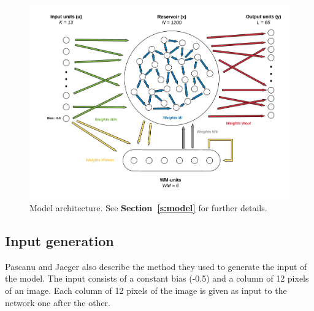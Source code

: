 \begin{figure}[h]
    \centering
    \includegraphics[width = \linewidth]{data/Architecture.png}
    \caption{Model architecture. See \textbf{Section~\ref{s:model}} for further details.}
    \label{fig:architecture}
\end{figure}

\subsection{Input generation}

Pascanu and Jaeger also describe the method they used to generate the input of the model.
The input consists of a constant bias (-0.5) and a column of 12 pixels of an image.
Each column of 12 pixels of the image is given as input to the network one after the other.


